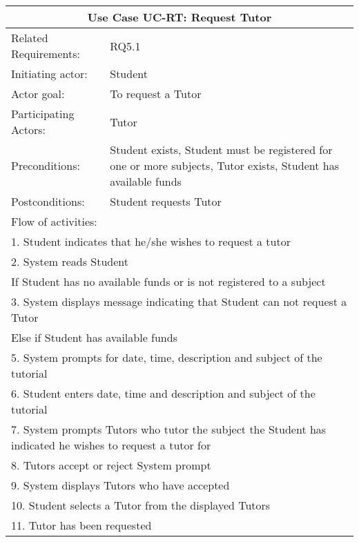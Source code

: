 \documentclass[12pt]{article}
\begin{document}
{%

\begin{tabular}{| l | p{10cm}| }
			\hline\multicolumn{2}{|c|}{ \textbf{Use Case UC-RT: Request Tutor}} \\ \hline
			Related Requirements: & RQ5.1\\ \hline
			Initiating actor: & Student\\ \hline
			Actor goal: & To request a Tutor\\ \hline
			Participating Actors: & Tutor\\ \hline
			Preconditions: & Student exists, Student must be registered for one or more subjects, Tutor exists, Student has available funds\\ \hline
			Postconditions: & Student requests Tutor\\ \hline
			\multicolumn{2}{|l|}{Flow of activities:}\\ \hline
			\multicolumn{2}{|p{15cm}|}{1. Student indicates that he/she wishes to request a tutor}\\
			\multicolumn{2}{|p{15cm}|}{2. System reads Student}\\
			\multicolumn{2}{|p{15cm}|}{If Student has no available funds or is not registered to a subject}\\
			\multicolumn{2}{|p{15cm}|}{3. System displays message indicating that Student can not request a Tutor}\\			
			\multicolumn{2}{|p{15cm}|}{Else if Student has available funds }	\\		
			\multicolumn{2}{|l|}{5. System prompts for date, time, description and subject of the tutorial}\\
			\multicolumn{2}{|l|}{6. Student enters date, time and description and subject of the tutorial}\\
			\multicolumn{2}{|p{15cm}|}{7. System prompts Tutors who tutor the subject the Student has indicated he wishes to request a tutor for}\\
			\multicolumn{2}{|l|}{8. Tutors accept or reject System prompt}\\
			\multicolumn{2}{|l|}{9. System displays Tutors who have accepted}\\
			\multicolumn{2}{|l|}{10. Student selects a Tutor from the displayed Tutors}\\
			\multicolumn{2}{|l|}{11. Tutor has been requested} 
			\\ \hline		
		\end{tabular}

}
\end{document}
